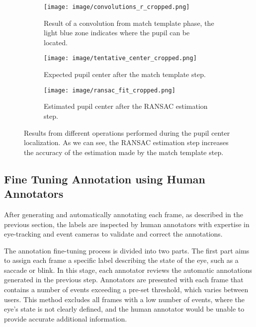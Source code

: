 \begin{figure}[t]
    \centering
    
    \begin{subfigure}[t]{0.32\textwidth}
        \centering
        \texttt{[image: image/convolutions\_r\_cropped.png]}
        \caption{Result of a convolution from match template phase, the light blue zone indicates where the pupil can be located.}
        \label{fig:convolutions}
    \end{subfigure}
    \hfill %
    \begin{subfigure}[t]{0.32\textwidth}
        \centering
        \texttt{[image: image/tentative\_center\_cropped.png]}
        \caption{Expected pupil center after the match template step.}
        \label{fig:tentative_center}
    \end{subfigure}
    \hfill %
    \begin{subfigure}[t]{0.32\textwidth}
        \centering
        \texttt{[image: image/ransac\_fit\_cropped.png]}
        \caption{Estimated pupil center after the RANSAC estimation step.}
        \label{fig:ransac_fit}
    \end{subfigure}
    
    \caption{Results from different operations performed during the pupil center localization. As we can see, the RANSAC estimation step increases the accuracy of the estimation made by the match template step.}
    \label{fig:predictor_3g}
\end{figure}


\subsection{Fine Tuning Annotation using Human Annotators} \label{fine_tune_annotation}

After generating and automatically annotating each frame, as described in the previous section, the labels are inspected by human annotators with expertise in eye-tracking and event cameras to validate and correct the annotations.

The annotation fine-tuning process is divided into two parts. The first part aims to assign each frame a specific label describing the state of the eye, such as a saccade or blink. In this stage, each annotator reviews the automatic annotations generated in the previous step. Annotators are presented with each frame that contains a number of events exceeding a pre-set threshold, which varies between users. This method excludes all frames with a low number of events, where the eye's state is not clearly defined, and the human annotator would be unable to provide accurate additional information.

